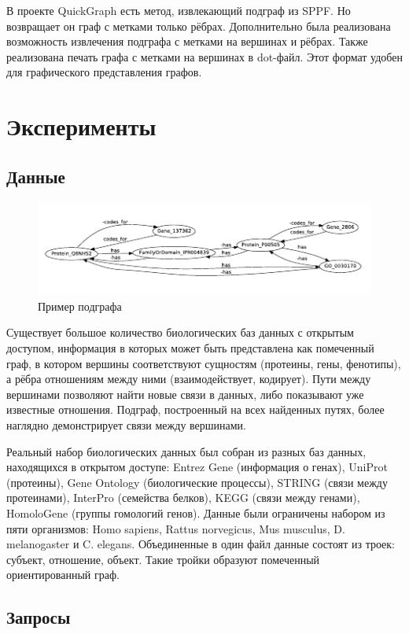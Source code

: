 \documentclass[14pt]{matmex-diploma}
\begin{document}
В проекте QuickGraph есть метод, извлекающий подграф из SPPF. Но возвращает он граф с метками только рёбрах. Дополнительно была реализована возможность извлечения подграфа с метками на вершинах и рёбрах. Также реализована печать графа с метками на вершинах в dot-файл. Этот формат удобен для графического представления графов.

\section{Эксперименты}
\subsection{Данные}

\begin{figure}
\centering
\includegraphics[width=16cm]{images/subgraph.pdf}
\caption{Пример подграфа}
\label{subgraph}
\end{figure}

Существует большое количество биологических баз данных с открытым доступом, информация в которых может быть представлена как помеченный граф, в котором вершины соответствуют сущностям (протеины, гены, фенотипы), а рёбра отношениям между ними (взаимодействует, кодирует). Пути между вершинами позволяют найти новые связи в данных, либо показывают уже известные отношения. Подграф, построенный на всех найденных путях, более наглядно демонстрирует связи между вершинами.

Реальный набор биологических данных был собран из разных баз данных, находящихся в открытом доступе:  Entrez Gene (информация о генах), UniProt (протеины), Gene Ontology (биологические процессы), STRING (связи между протеинами), InterPro (семейства белков), KEGG (связи между генами), HomoloGene (группы гомологий генов). Данные были ограничены набором из пяти организмов: Homo sapiens, Rattus norvegicus, Mus musculus, D. melanogaster и C. elegans. Объединенные в один файл данные состоят из троек: субъект, отношение, объект. Такие тройки образуют помеченный ориентированный граф.
\subsection{Запросы}
\end{document}
